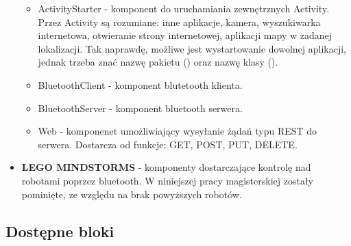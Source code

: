 \begin{itemize}
\begin{itemize}
\item ActivityStarter - komponent do uruchamiania zewnętrznych Activity. Przez Activity są rozumiane: inne aplikacje, kamera, wyszukiwarka internetowa, otwieranie strony internetowej, aplikacji mapy w zadanej lokalizacji. Tak naprawdę, możliwe jest wystartowanie dowolnej aplikacji, jednak trzeba znać nazwę pakietu () oraz nazwę klasy ().
\item BluetoothClient - komponent blutetooth klienta.
\item BluetoothServer - komponent bluetooth serwera.
\item Web - komponenet umożliwiający wysyłanie żądań typu REST do serwera. Dostarcza od funkcje: GET, POST, PUT, DELETE.
\end{itemize}

\item \textbf{LEGO MINDSTORMS} - komponenty dostarczające kontrolę nad robotami poprzez bluetooth. W niniejszej pracy magisterskiej zostały pominięte, ze względu na brak powyższych robotów.
\end{itemize}

\subsection{Dostępne bloki}

